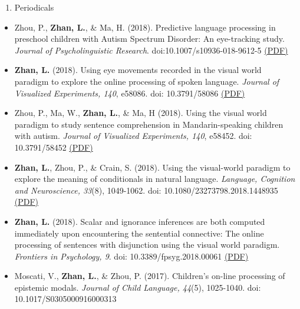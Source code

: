\documentclass[10pt,]{article}
\providecommand{\tightlist}{%
  \setlength{\itemsep}{0pt}\setlength{\parskip}{0pt}}
\begin{document}
\begin{enumerate}
\def\labelenumi{\arabic{enumi}.}
\setcounter{enumi}{1}
\tightlist
\item
  Periodicals
\end{enumerate}

\begin{itemize}
\item
  Zhou, P., \textbf{Zhan, L.}, \& Ma, H. (2018). Predictive language
  processing in preschool children with Autism Spectrum Disorder: An
  eye-tracking study. \emph{Journal of Psycholinguistic Research}.
  doi:10.1007/s10936-018-9612-5
  \href{https://publications.likan.info/Periodicals/JPsycholinguistRes2018.pdf}{(PDF)}
\item
  \textbf{Zhan, L.} (2018). Using eye movements recorded in the visual
  world paradigm to explore the online processing of spoken language.
  \emph{Journal of Visualized Experiments, 140}, e58086. doi:
  10.3791/58086
  \href{https://publications.likan.info/Periodicals/jove-protocol-58086.pdf}{(PDF)}
\item
  Zhou, P., Ma, W., \textbf{Zhan, L.}, \& Ma, H (2018). Using the visual
  world paradigm to study sentence comprehension in Mandarin-speaking
  children with autism. \emph{Journal of Visualized Experiments, 140},
  e58452. doi: 10.3791/58452
  \href{https://publications.likan.info/Periodicals/jove-protocol-58452.pdf}{(PDF)}
\item
  \textbf{Zhan, L.}, Zhou, P., \& Crain, S. (2018). Using the
  visual-world paradigm to explore the meaning of conditionals in
  natural language. \emph{Language, Cognition and Neuroscience, 33}(8),
  1049-1062. doi: 10.1080/23273798.2018.1448935
  \href{https://publications.likan.info/Periodicals/LangCognNeurosci2018.pdf}{(PDF)}
\item
  \textbf{Zhan, L.} (2018). Scalar and ignorance inferences are both
  computed immediately upon encountering the sentential connective: The
  online processing of sentences with disjunction using the visual world
  paradigm. \emph{Frontiers in Psychology, 9}. doi:
  10.3389/fpsyg.2018.00061
  \href{https://www.frontiersin.org/articles/10.3389/fpsyg.2018.00061/full}{(PDF)}
\item
  Moscati, V., \textbf{Zhan, L.}, \& Zhou, P. (2017). Children's on-line
  processing of epistemic modals. \emph{Journal of Child Language,
  44}(5), 1025-1040. doi: 10.1017/S0305000916000313\\


\end{itemize}
\end{document}
